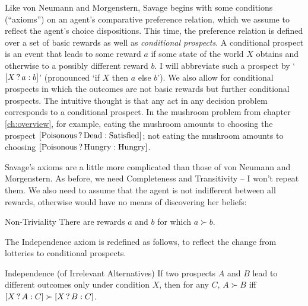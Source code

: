 Like von Neumann and Morgenstern, Savage begins with some conditions
(``axioms'') on an agent's comparative preference relation, which we
assume to reflect the agent's choice dispositions. This time, the
preference relation is defined over a set of basic rewards as well as
\emph{conditional prospects}. A conditional prospect is an event that
leads to some reward $a$ if some state of the world $X$ obtains and
otherwise to a possibly different reward $b$. I will abbreviate such a
prospect by `$[X\,?\, a :b]$' (pronounced `if $X$ then $a$ else $b$').
We also allow for conditional prospects in which the outcomes are not
basic rewards but further conditional prospects. The intuitive thought
is that any act in any decision problem corresponds to a conditional
prospect. In the mushroom problem from chapter \ref{ch:overview}, for
example, eating the mushroom amounts to choosing the prospect
$[\text{Poisonous}\,?\, \text{Dead} :\text{Satisfied}]$; not eating
the mushroom amounts to choosing
$[\text{Poisonous}\,?\, \text{Hungry} :\text{Hungry}]$.

Savage's axioms are a little more complicated than those of von
Neumann and Morgenstern. As before, we need Completeness and
Transitivity -- I won't repeat them. We also need to assume that the
agent is not indifferent between all rewards, otherwise would have no
means of discovering her beliefs:
%
\begin{genericthm}{Non-Triviality}
  There are rewards $a$ and $b$ for which $a\succ b$.
\end{genericthm}

The Independence axiom is redefined as follows, to reflect the change
from lotteries to conditional prospects.
%
%
\begin{genericthm}{Independence (of Irrelevant Alternatives)} 
  If two prospects $A$ and $B$ lead to different outcomes only under
  condition $X$, then for any $C$, $A \succ B$ iff $[X\,?\, A :C]
  \succ [X\,?\, B :C]$.
\end{genericthm}

